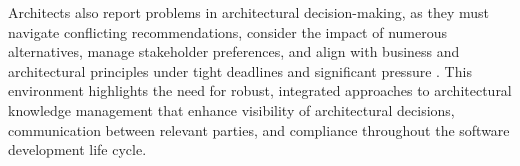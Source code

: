         Architects also report problems in architectural decision-making, as they must navigate conflicting recommendations, consider the impact of numerous alternatives, manage stakeholder preferences, and align with business and architectural principles under tight deadlines and significant pressure  \cite{archtitect_survey}. This environment highlights the need for robust, integrated approaches to architectural knowledge management that enhance visibility of architectural decisions, communication between relevant parties, and compliance throughout the software development life cycle.